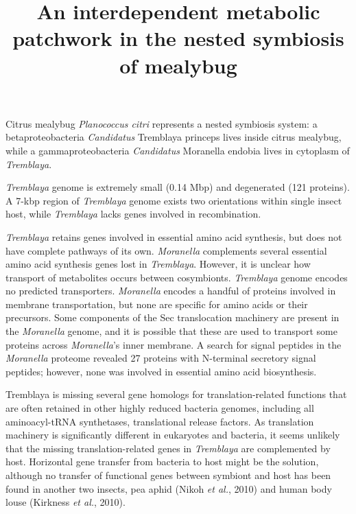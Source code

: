 \documentclass[11pt]{article}
\title{An interdependent metabolic patchwork in the nested symbiosis of mealybug}
\author{}
\date{}
\begin{document}
  \maketitle

  \linenumbers
Citrus mealybug \textit{Planococcus citri} represents a nested symbiosis system: 
a betaproteobacteria \textit{Candidatus} Tremblaya princeps lives inside citrus mealybug, while a gammaproteobacteria \textit{Candidatus} Moranella endobia lives in cytoplasm of \textit{Tremblaya}. 

\newline

\textit{Tremblaya} genome is extremely small (0.14 Mbp) and degenerated (121 proteins). 
A 7-kbp region of \textit{Tremblaya} genome exists two orientations within single insect host, while \textit{Tremblaya} lacks genes involved in recombination. 


\newline

\textit{Tremblaya} retains genes involved in essential amino acid synthesis, but does not have complete pathways of its own. \textit{Moranella} complements several essential amino acid synthesis genes lost in \textit{Tremblaya}. 
However, it is unclear how transport of metabolites occurs between cosymbionts. 
\textit{Tremblaya} genome encodes no predicted transporters. 
\textit{Moranella} encodes a handful of proteins involved in membrane transportation, but none are specific for amino acids
or their precursors. 
Some components of the Sec translocation machinery are present in the \textit{Moranella} genome, and it is possible that these are used to transport some proteins across \textit{Moranella}’s inner membrane. 
A search for signal peptides in the \textit{Moranella} proteome revealed 27 proteins with N-terminal secretory signal peptides; however, none was involved in essential amino acid biosynthesis. 

\newline

Tremblaya is missing several gene homologs for translation-related functions that are often retained in other highly reduced bacteria genomes, including all aminoacyl-tRNA synthetases, translational release factors. 
As translation machinery is significantly different in eukaryotes and bacteria, it seems unlikely that the missing translation-related genes in \textit{Tremblaya} are complemented by host. 
Horizontal gene transfer from bacteria to host might be the solution, although no transfer of functional genes
between symbiont and host has been found in another two insects, pea aphid (Nikoh \textit{et al.}, 2010) and human body louse (Kirkness \textit{et al.}, 2010). 
\end{document}
